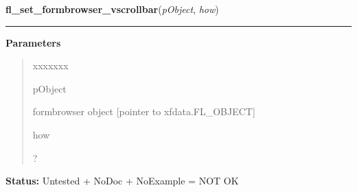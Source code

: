 \hspace{.8\funcindent}\begin{boxedminipage}{\funcwidth}

    \raggedright \textbf{fl\_set\_formbrowser\_vscrollbar}(\textit{pObject}, \textit{how})

    \vspace{-1.5ex}

    \rule{\textwidth}{0.5\fboxrule}
\setlength{\parskip}{2ex}
\setlength{\parskip}{1ex}
      \textbf{Parameters}
      \vspace{-1ex}

      \begin{quote}
        \begin{Ventry}{xxxxxxx}

          \item[pObject]

          formbrowser object [pointer to xfdata.FL\_OBJECT]

          \item[how]

          ?

        \end{Ventry}

      \end{quote}

\textbf{Status:} Untested + NoDoc + NoExample = NOT OK



    \end{boxedminipage}

    \label{xformslib:library:fl_get_formbrowser_topform}

    \vspace{0.5ex}

